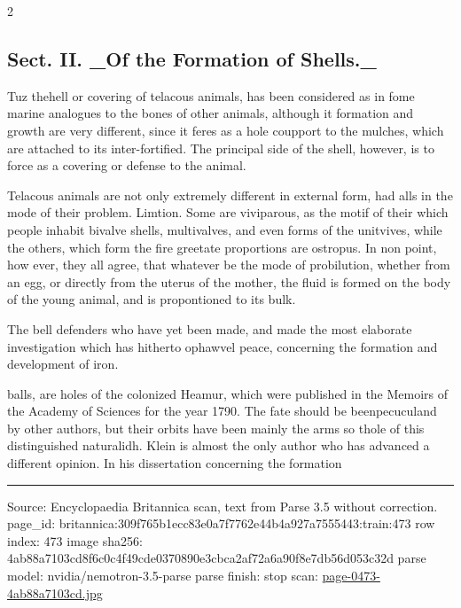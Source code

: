 \documentclass[10pt]{article}
\begin{document}
\begin{multicols}{2}
\subsection*{Sect. II. \_Of the Formation of Shells.\_}
Tuz thehell or covering of telacous animals, has been considered as in fome marine analogues to the bones of other animals, although it formation and growth are very different, since it feres as a hole coupport to the mulches, which are attached to its inter-fortified. The principal side of the shell, however, is to force as a covering or defense to the animal.

Telacous animals are not only extremely different in external form, had alls in the mode of their problem. Limtion. Some are viviparous, as the motif of their which people inhabit bivalve shells, multivalves, and even forms of the unitvives, while the others, which form the fire greetate proportions are ostropus. In non point, how ever, they all agree, that whatever be the mode of probilution, whether from an egg, or directly from the uterus of the mother, the fluid is formed on the body of the young animal, and is propontioned to its bulk.

The bell defenders who have yet been made, and made the most elaborate investigation which has hitherto ophawvel peace, concerning the formation and development of iron.

balls, are holes of the colonized Heamur, which were published in the Memoirs of the Academy of Sciences for the year 1790. The fate should be beenpecuculand by other authors, but their orbits have been mainly the arms so thole of this distinguished naturalidh. Klein is almost the only author who has advanced a different opinion. In his dissertation concerning the formation

\end{multicols}
\vfill\par\noindent\rule{\linewidth}{0.4pt}\par
{\scriptsize\color{gray}\noindent Source: Encyclopaedia Britannica scan, text from Parse 3.5 without correction. page\_id: britannica:309f765b1ecc83e0a7f7762e44b4a927a7555443:train:473 \quad row index: 473 \quad image sha256: 4ab88a7103cd8f6c0c4f49cde0370890e3cbca2af72a6a90f8e7db56d053c32d \quad parse model: nvidia/nemotron-3.5-parse \quad parse finish: stop \quad scan: \href{../scans/page-0473-4ab88a7103cd.jpg}{page-0473-4ab88a7103cd.jpg}\par}
\end{document}
